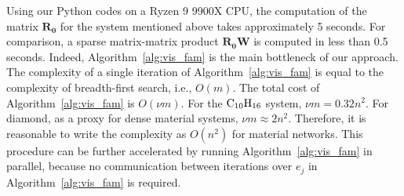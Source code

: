 \documentclass[fleqn,11pt]{article}
\begin{document}
Using our Python codes on a Ryzen 9 9900X CPU, the computation of the matrix $\bm{R_0}$ for the system mentioned above takes approximately 5 seconds.
For comparison, a sparse matrix-matrix product $\bm{R_0 W}$ is computed in less than 0.5 seconds. Indeed, Algorithm~\ref{alg:vis_fam} is the main bottleneck of our approach. The complexity of a single iteration of Algorithm~\ref{alg:vis_fam} is equal to the complexity of breadth-first search, i.e., $O(m)$. The total cost of Algorithm~\ref{alg:vis_fam} is $O(\nu m)$. 
For the $\rm C_{10}H_{16}$ system, $\nu m = 0.32 n^2$.
For diamond, as a proxy for dense material systems, $\nu m\approx 2n^2$. Therefore, it is reasonable to write the complexity as $O(n^2)$ for material networks. This procedure can be further accelerated by running Algorithm~\ref{alg:vis_fam} in parallel, because no communication between iterations over $e_j$ in Algorithm~\ref{alg:vis_fam} is required.

\end{document}
